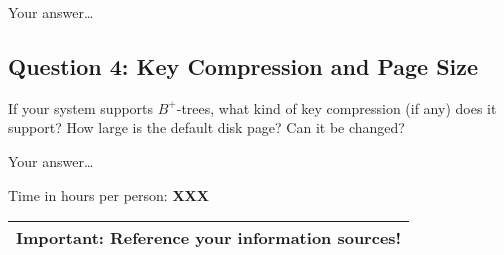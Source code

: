 \documentclass[11pt]{scrartcl}
\begin{document}
\smallskip

Your answer\dots

\subsection*{Question 4: Key Compression and Page Size} If your system
supports $B^+$-trees, what kind of key compression (if any) does it
support?  How large is the default disk page? Can it be changed?


\smallskip

Your answer\dots


\bigskip

\noindent Time in hours per person: {\bf XXX}

\bigskip

\begin{center}
  \begin{tabular}{c}
    \hline
    {\bf Important:} Reference your information sources!
    \\\hline
  \end{tabular}
\end{center}
\end{document}
